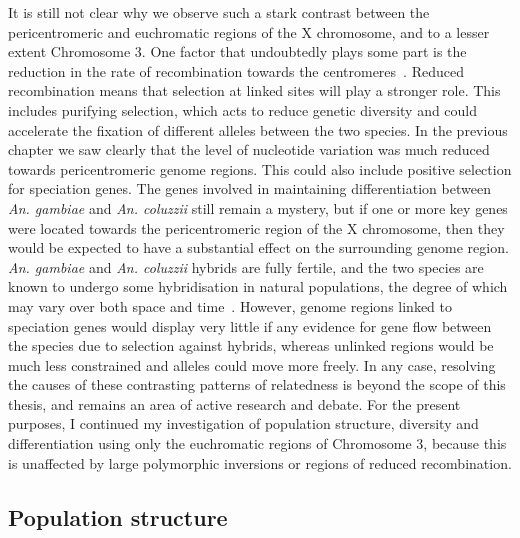 \begin{refsection}
It is still not clear why we observe such a stark contrast between the pericentromeric and euchromatic regions of the X chromosome, and to a lesser extent Chromosome 3.
%
One factor that undoubtedly plays some part is the reduction in the rate of recombination towards the centromeres~\parencite{Cruickshank2014}.
%
Reduced recombination means that selection at linked sites will play a stronger role.
%
This includes purifying selection, which acts to reduce genetic diversity and could accelerate the fixation of different alleles between the two species.
%
In the previous chapter we saw clearly that the level of nucleotide variation was much reduced towards pericentromeric genome regions.
%
This could also include positive selection for speciation genes.
%
The genes involved in maintaining differentiation between \textit{An. gambiae} and \textit{An. coluzzii} still remain a mystery, but if one or more key genes were located towards the pericentromeric region of the X chromosome, then they would be expected to have a substantial effect on the surrounding genome region.
%
\textit{An. gambiae} and \textit{An. coluzzii} hybrids are fully fertile, and the two species are known to undergo some hybridisation in natural populations, the degree of which may vary over both space and time~\parencite{Weetman2012,Lee2013}.
%
However, genome regions linked to speciation genes would display very little if any evidence for gene flow between the species due to selection against hybrids, whereas unlinked regions would be much less constrained and alleles could move more freely.
%
In any case, resolving the causes of these contrasting patterns of relatedness is beyond the scope of this thesis, and remains an area of active research and debate.
%
For the present purposes, I continued my investigation of population structure, diversity and differentiation using only the euchromatic regions of Chromosome 3, because this is unaffected by large polymorphic inversions or regions of reduced recombination.


\subsection{Population structure}\label{subsec:pop-structure}



\end{refsection}
